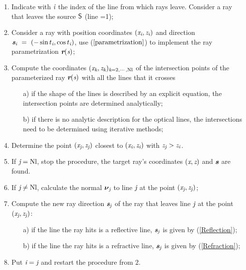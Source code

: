 \begin{enumerate}
\item Indicate with $\textit{i}$ the index of the line from which rays leave. Consider a ray that leaves the source $\textsf{S}$ (line =1);
 \item Consider a ray with position coordinates $(\textit{x}_{\textit{i}}, \textit{z}_{\textit{i}})$ and direction $\textit{\textbf{s}}_{\textit{i}}~=~(-\sin t_{\textit{i}}, \cos t_{\textit{i}})$, use ($\ref{parametrization}$) to implement the ray parametrization $\textit{\textbf{r}}(\textit{s})$;
\item Compute the coordinates $(\textit{x}_{\textit{k}}, \textit{z}_{\textit{k}})_{\textit{k} = 2, \cdots, \textrm{Nl}}$ of the intersection points of the parameterized ray $\textit{\textbf{r}}(\textit{s})$ with all the lines that it crosses
\begin{itemize}
\item[a)] if the shape of the lines is described by an explicit equation, the intersection points are determined analytically;
\item[b)] if there is no analytic description for the optical lines, the intersections need to be determined using iterative methods;
\end{itemize}
\item  Determine the point $(\textit{x}_{\textit{j}}, \textit{z}_{\textit{j}})$ closest to $(\textit{x}_{\textit{i}}, \textit{z}_{\textit{i}})$ with 
$\textit{z}_{\textit{j}}>\textit{z}_{\textit{i}}$.
\item If $\textit{j} = \textrm{Nl}$, stop the procedure, the target ray's coordinates $(\textit{x}, \textit{z})$ and $\textit{\textbf{s}}$ are found.
\item If $\textit{j} \neq \textrm{Nl}$, calculate the normal $\boldsymbol{\nu}_{\textit{j}}$ to line $\textit{j}$ at the point $(\textit{x}_{\textit{j}}, \textit{z}_{\textit{j}})$;
 \item Compute the new ray direction $\textit{\textbf{s}}_{\textit{j}}$ of the ray that leaves line $\textit{j}$ at the point $(\textit{x}_{\textit{j}}, \textit{z}_{\textit{j}})$:
\begin{itemize}
\item[a)] if the line the ray hits is a reflective line, $\textit{\textbf{s}}_{\textit{j}}$ is given by (\ref{Reflection});
\item[b)] if the line the ray hits is a refractive line, $\textit{\textbf{s}}_{\textit{j}}$ is given by (\ref{Refraction});
\end{itemize}
\item Put $\textit{i}=\textit{j}$ and restart the procedure from $2.$
\end{enumerate}
